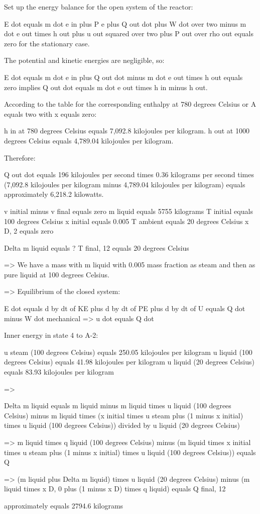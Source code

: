 Set up the energy balance for the open system of the reactor:

E dot equals m dot e in plus P e plus Q out dot plus W dot over two minus m dot e out times h out plus u out squared over two plus P out over rho out equals zero for the stationary case.

The potential and kinetic energies are negligible, so:

E dot equals m dot e in plus Q out dot minus m dot e out times h out equals zero implies Q out dot equals m dot e out times h in minus h out.

According to the table for the corresponding enthalpy at 780 degrees Celsius or A equals two with x equals zero:

h in at 780 degrees Celsius equals 7,092.8 kilojoules per kilogram.
h out at 1000 degrees Celsius equals 4,789.04 kilojoules per kilogram.

Therefore:

Q out dot equals 196 kilojoules per second times 0.36 kilograms per second times (7,092.8 kilojoules per kilogram minus 4,789.04 kilojoules per kilogram) equals approximately 6,218.2 kilowatts.

v initial minus v final equals zero  
m liquid equals 5755 kilograms  
T initial equals 100 degrees Celsius  
x initial equals 0.005  
T ambient equals 20 degrees Celsius  
x D, 2 equals zero  

Delta m liquid equals ?  
T final, 12 equals 20 degrees Celsius  

=> We have a mass with m liquid with 0.005 mass fraction as steam and then as pure liquid at 100 degrees Celsius.  

=> Equilibrium of the closed system:  

E dot equals d by dt of KE plus d by dt of PE plus d by dt of U equals Q dot minus W dot mechanical => u dot equals Q dot  

Inner energy in state 4 to A-2:  

u steam (100 degrees Celsius) equals 250.05 kilojoules per kilogram  
u liquid (100 degrees Celsius) equals 41.98 kilojoules per kilogram  
u liquid (20 degrees Celsius) equals 83.93 kilojoules per kilogram  

=>  

Delta m liquid equals m liquid minus m liquid times u liquid (100 degrees Celsius) minus m liquid times (x initial times u steam plus (1 minus x initial) times u liquid (100 degrees Celsius)) divided by u liquid (20 degrees Celsius)  

=> m liquid times q liquid (100 degrees Celsius) minus (m liquid times x initial times u steam plus (1 minus x initial) times u liquid (100 degrees Celsius)) equals Q  

=> (m liquid plus Delta m liquid) times u liquid (20 degrees Celsius) minus (m liquid times x D, 0 plus (1 minus x D) times q liquid) equals Q final, 12  

approximately equals 2794.6 kilograms